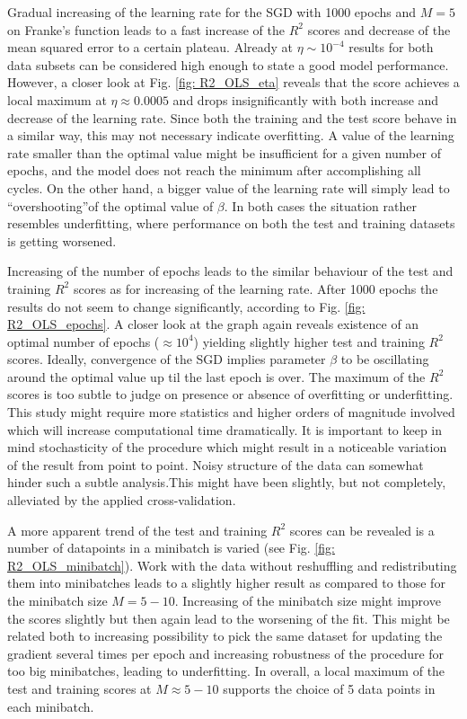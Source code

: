 \documentclass{emulateapj}
\begin{document}
Gradual increasing of the learning rate for the SGD with 1000 epochs and $M=5$ on Franke's function leads to a fast increase of the $R^2$ scores and decrease of the mean squared error to a certain plateau. Already at $\eta\sim10^{-4}$ results for both data subsets can be considered high enough to state a good model performance. However, a closer look at Fig. \ref{fig: R2_OLS_eta} reveals that the score achieves a local maximum at $\eta\approx0.0005$ and drops insignificantly with both increase and decrease of the learning rate. Since both the training and the test score behave in a similar way, this may not necessary indicate overfitting. A value of the learning rate smaller than the optimal value might be insufficient for a given number of epochs, and the model does not reach the minimum after accomplishing all cycles. On the other hand, a bigger value of the learning rate will simply lead to \textquotedblleft overshooting\textquotedblright of the optimal value of $\beta$. In both cases the situation rather resembles underfitting, where performance on both the test and training datasets is getting worsened. 


Increasing of the number of epochs leads to the similar behaviour of the test and training $R^2$ scores as for increasing of the learning rate. After 1000 epochs the results do not seem to change significantly, according to Fig. \ref{fig: R2_OLS_epochs}. A closer look at the graph again reveals existence of an optimal number of epochs ($\approx10^4$) yielding slightly higher test and training $R^2$ scores. Ideally, convergence of the SGD implies parameter $\beta$ to be oscillating around the optimal value up til the last epoch is over. The maximum of the $R^2$ scores is too subtle to judge on presence or absence of overfitting or underfitting. This study might require more statistics and higher orders of magnitude involved which will increase computational time dramatically. It is important to keep in mind stochasticity of the procedure which might result in a noticeable variation of the result from point to point. Noisy structure of the data can somewhat hinder such a subtle analysis.This might have been slightly, but not completely, alleviated by the applied cross-validation.


A more apparent trend of the test and training $R^2$ scores can be revealed is a number of datapoints in a minibatch is varied (see Fig. \ref{fig: R2_OLS_minibatch}). Work with the data without reshuffling and redistributing them into minibatches leads to a slightly higher result as compared to those for the minibatch size $M=5-10$. Increasing of the minibatch size might improve the scores slightly but then again lead to the worsening of the fit. This might be related both to increasing possibility to pick the same dataset for updating the gradient several times per epoch and increasing robustness of the procedure for too big minibatches, leading to underfitting. In overall, a local maximum of the test and training scores at $M\approx5-10$ supports the choice of 5 data points in each minibatch. 
\end{document}
